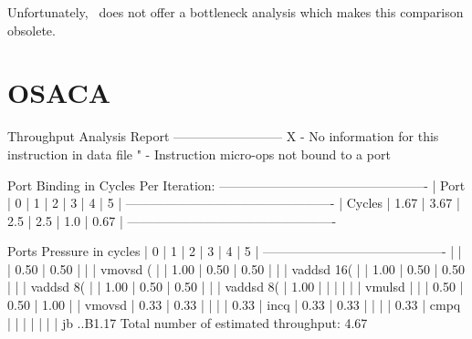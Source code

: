 Unfortunately, \osaca\ does not offer a bottleneck analysis which makes this comparison obsolete.


\section{OSACA}

\begin{Example}
    Throughput Analysis Report
    --------------------------
    X - No information for this instruction in data file
    " - Instruction micro-ops not bound to a port
    
    Port Binding in Cycles Per Iteration:
    -------------------------------------------------
    | Port   |   0  |   1  |  2  |  3  |  4  |   5  |
    -------------------------------------------------
    | Cycles | 1.67 | 3.67 | 2.5 | 2.5 | 1.0 | 0.67 |
    -------------------------------------------------
    
    Ports Pressure in cycles
    |   0  |   1  |   2  |   3  |   4  |   5  |
    -------------------------------------------
    |      |      | 0.50 | 0.50 |      |      | vmovsd  (%
    |      | 1.00 | 0.50 | 0.50 |      |      | vaddsd  16(%
    |      | 1.00 | 0.50 | 0.50 |      |      | vaddsd  8(%
    |      | 1.00 | 0.50 | 0.50 |      |      | vaddsd  8(%
    | 1.00 |      |      |      |      |      | vmulsd  %
    |      |      | 0.50 | 0.50 | 1.00 |      | vmovsd  %
    | 0.33 | 0.33 |      |      |      | 0.33 | incq    %
    | 0.33 | 0.33 |      |      |      | 0.33 | cmpq    %
    |      |      |      |      |      |      | jb      ..B1.17
    Total number of estimated throughput: 4.67
\end{Example}

















